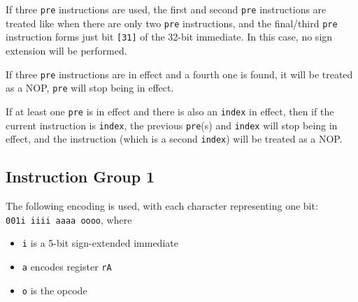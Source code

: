 \documentclass{article}
\begin{document}
	If three \texttt{pre} instructions are used, the first and second
	\texttt{pre} instructions are treated like when there are only two
	\texttt{pre} instructions, and the final/third \texttt{pre} instruction
	forms just bit \texttt{[31]} of the 32-bit immediate.  In this case, no
	sign extension will be performed.




	If three \texttt{pre} instructions are in effect and a fourth one is
	found, it will be treated as a NOP, \texttt{pre} will stop being in
	effect. 

	If at least one \texttt{pre} is in effect and there is also an
	\texttt{index} in effect, then if the current instruction is
	\texttt{index}, the previous \texttt{pre}(s) and \texttt{index} will
	stop being in effect, and the instruction (which is a second
	\texttt{index}) will be treated as a NOP.




	\subsection{Instruction Group 1}
	The following encoding is used, with each character representing one
	bit:  \\
	\texttt{001i iiii aaaa oooo}, where

	\singlespacing
	\begin{itemize}
		\item \texttt{i} is a 5-bit sign-extended immediate
		\item \texttt{a} encodes register \texttt{rA}
		\item \texttt{o} is the opcode
	\end{itemize}
	\doublespacing
\end{document}
